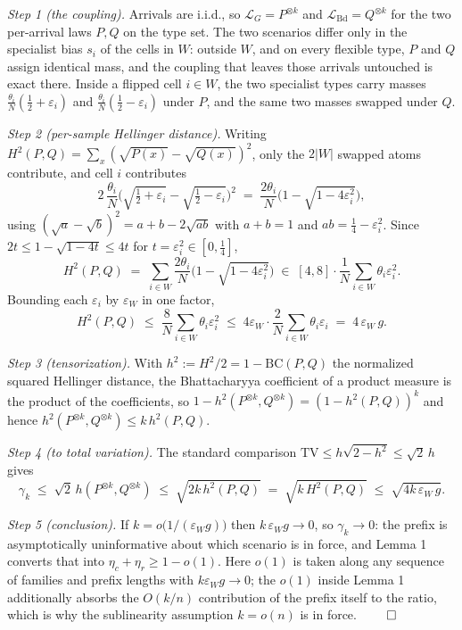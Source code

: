 \emph{Step 1 (the coupling).} Arrivals are i.i.d., so
\(\mathcal L_G = P^{\otimes k}\) and
\(\mathcal L_{\mathrm{Bd}} = Q^{\otimes k}\) for the two per-arrival
laws \(P,Q\) on the type set. The two scenarios differ only in the
specialist bias \(s_i\) of the cells in \(W\): outside \(W\), and on
every flexible type, \(P\) and \(Q\) assign identical mass, and the
coupling that leaves those arrivals untouched is exact there. Inside a
flipped cell \(i\in W\), the two specialist types carry masses
\(\tfrac{\theta_i}{N}(\tfrac12+\varepsilon_i)\) and
\(\tfrac{\theta_i}{N}(\tfrac12-\varepsilon_i)\) under \(P\), and the
same two masses swapped under \(Q\).

\emph{Step 2 (per-sample Hellinger distance).} Writing
\(H^2(P,Q)=\sum_x(\sqrt{P(x)}-\sqrt{Q(x)})^2\), only the \(2|W|\)
swapped atoms contribute, and cell \(i\) contributes
\[2\,\frac{\theta_i}{N}\Big(\sqrt{\tfrac12+\varepsilon_i}-\sqrt{\tfrac12-\varepsilon_i}\Big)^{2}
\;=\; \frac{2\theta_i}{N}\Big(1-\sqrt{1-4\varepsilon_i^{2}}\Big),\]
using \((\sqrt a-\sqrt b)^2 = a+b-2\sqrt{ab}\) with \(a+b=1\) and
\(ab=\tfrac14-\varepsilon_i^2\). Since \(2t \le 1-\sqrt{1-4t} \le 4t\)
for \(t=\varepsilon_i^2\in[0,\tfrac14]\),
\[H^2(P,Q) \;=\; \sum_{i\in W}\frac{2\theta_i}{N}\Big(1-\sqrt{1-4\varepsilon_i^{2}}\Big)
\;\in\; [4,8]\cdot\frac{1}{N}\sum_{i\in W}\theta_i\varepsilon_i^{2}.\]
Bounding each \(\varepsilon_i\) by \(\varepsilon_W\) in one factor,
\[H^2(P,Q) \;\le\; \frac{8}{N}\sum_{i\in W}\theta_i\varepsilon_i^{2}
\;\le\; 4\varepsilon_W\cdot\frac{2}{N}\sum_{i\in W}\theta_i\varepsilon_i
\;=\; 4\,\varepsilon_W\,g .\]

\emph{Step 3 (tensorization).} With
\(h^2 := H^2/2 = 1-\mathrm{BC}(P,Q)\) the normalized squared Hellinger
distance, the Bhattacharyya coefficient of a product measure is the
product of the coefficients, so
\(1-h^2(P^{\otimes k},Q^{\otimes k}) = (1-h^2(P,Q))^k\) and hence
\(h^2(P^{\otimes k},Q^{\otimes k}) \le k\,h^2(P,Q)\).

\emph{Step 4 (to total variation).} The standard comparison
\(\mathrm{TV}\le h\sqrt{2-h^{2}}\le\sqrt2\,h\) gives
\[\gamma_k \;\le\; \sqrt2\,h(P^{\otimes k},Q^{\otimes k}) \;\le\; \sqrt{2k\,h^2(P,Q)}
\;=\; \sqrt{k\,H^2(P,Q)} \;\le\; \sqrt{4k\,\varepsilon_W\,g}.\]

\emph{Step 5 (conclusion).} If \(k=o\!\big(1/(\varepsilon_W g)\big)\)
then \(k\,\varepsilon_W g\to0\), so \(\gamma_k\to0\): the prefix is
asymptotically uninformative about which scenario is in force, and Lemma
1 converts that into \(\eta_c+\eta_r\ge1-o(1)\). Here \(o(1)\) is taken
along any sequence of families and prefix lengths with
\(k\varepsilon_W g\to0\); the \(o(1)\) inside Lemma 1 additionally
absorbs the \(O(k/n)\) contribution of the prefix itself to the ratio,
which is why the sublinearity assumption \(k=o(n)\) is in force.
\(\qed\)

